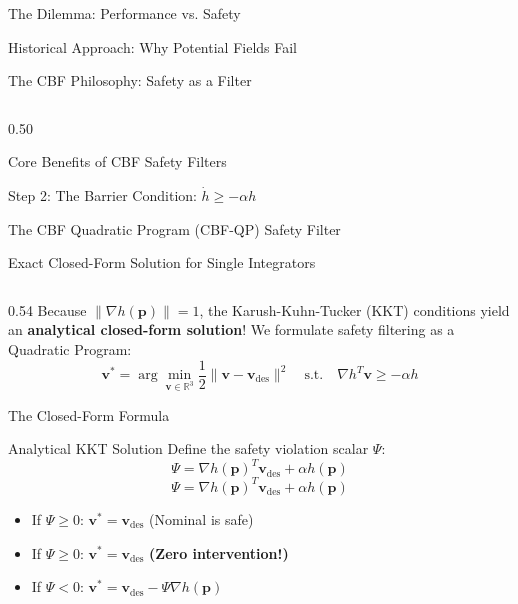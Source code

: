 \documentclass[aspectratio=169,10pt]{beamer}
\begin{document}
\begin{frame}{The Dilemma: Performance vs. Safety}
\begin{frame}{Historical Approach: Why Potential Fields Fail}
\begin{frame}{The CBF Philosophy: Safety as a Filter}
\begin{column}{0.50\textwidth}
\begin{exampleblock}{Core Benefits of CBF Safety Filters}
\begin{frame}{Step 2: The Barrier Condition: $\dot{h} \ge -\alpha h$}
\begin{frame}{The CBF Quadratic Program (CBF-QP) Safety Filter}
\begin{frame}{Exact Closed-Form Solution for Single Integrators}
  \begin{columns}[T]
    \begin{column}{0.54\textwidth}
      Because $\|\nabla h(\mathbf{p})\| = 1$, the Karush-Kuhn-Tucker (KKT) conditions yield an \textbf{analytical closed-form solution}!
      We formulate safety filtering as a Quadratic Program:
      $$\mathbf{v}^* = \arg\min_{\mathbf{v} \in \mathbb{R}^3} \frac{1}{2}\|\mathbf{v} - \mathbf{v}_{\mathrm{des}}\|^2 \quad \text{s.t.} \quad \nabla h^T \mathbf{v} \ge -\alpha h$$

      \begin{block}{The Closed-Form Formula}
      \begin{block}{Analytical KKT Solution}
        \small
        Define the safety violation scalar $\Psi$:
        \begin{equation*}
          \Psi = \nabla h(\mathbf{p})^T \mathbf{v}_{\mathrm{des}} + \alpha h(\mathbf{p})
        \end{equation*}
        $$\Psi = \nabla h(\mathbf{p})^T \mathbf{v}_{\mathrm{des}} + \alpha h(\mathbf{p})$$
        \begin{itemize}
          \item If $\Psi \ge 0$: $\mathbf{v}^* = \mathbf{v}_{\mathrm{des}}$ (Nominal is safe)
          \item If $\Psi \ge 0$: $\mathbf{v}^* = \mathbf{v}_{\mathrm{des}}$ \textbf{(Zero intervention!)}
          \item If $\Psi < 0$: $\mathbf{v}^* = \mathbf{v}_{\mathrm{des}} - \Psi \nabla h(\mathbf{p})$
        \end{itemize}
      \end{block}


\end{block}
\end{column}
\end{columns}
\end{frame}
\end{frame}
\end{frame}
\end{exampleblock}
\end{column}
\end{frame}
\end{frame}
\end{frame}
\end{document}
